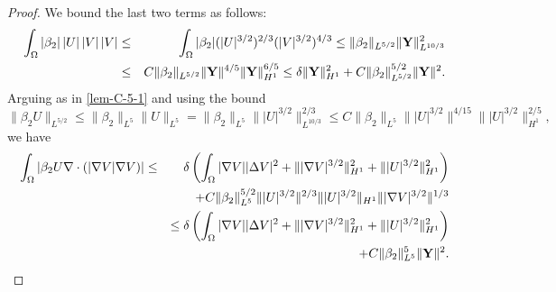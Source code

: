 \documentclass[11pt,reqno]{amsart}%
\numberwithin{equation}{section}
\begin{document}
{\begin{proof}
We bound the last two terms as follows:
 \begin{eqnarray}
\int_\Omega|\beta_2|\, |U|\,|V|\,|V|
&\le&\int_\Omega |\beta_2| (|U|^{3/2})^{2/3} (|V| ^{3/2})^{4/3}%
\le  \Vert \beta_2 \Vert_{L^{5/2}} \|{\bf Y}\|_{L^{10/3}}^2
\nonumber\\
&\le& C \Vert \beta_2 \Vert_{L^{5/2}} \|{\bf Y}\|^{4/5}  \|{\bf Y}\|_{H^1}^{6/5}
\le  \delta  \|{\bf Y}\|_{H^1}^{2} + C \Vert \beta_2 \Vert_{L^{5/2}}^{5/2} \|{\bf Y}\|^{2}.
\label{corol-A-8}
\end{eqnarray}
Arguing as in \eqref{lem-C-5-1} and using the bound
$$\|\beta_2U\|_{L^{5/2}}
\le \|\beta_2\|_{L^{5}} \| U\|_{L^5}
= \|\beta_2\|_{L^{5}} \| |U|^{3/2} \|_{L^{10/3}}^{2/3}
\le C \|\beta_2\|_{L^{5}} \| |U|^{3/2} \|^{4/15}  \| |U|^{3/2} \|_{H^1}^{2/5},
$$
  we have 
\begin{eqnarray}
\int_\Omega| \beta_2U\nabla\cdot(|\nabla V|\nabla V)|
&\le& \delta\left(\int_\Omega |\nabla V||\Delta V|^2+\||\nabla V|^{3/2}\|^2_{H^1}+\||U|^{3/2}\|^2_{H^1}\right) 
\nonumber\\
&&\ \ +C\|\beta_2\|_{L^{5}}^{5/2} \| |U|^{3/2} \|^{2/3}  \| |U|^{3/2} \|_{H^1} \||\nabla V|^{3/2}\|^{1/3}  
\nonumber\\
&&\le \delta\left(\int_\Omega |\nabla V||\Delta V|^2+\||\nabla V|^{3/2}\|^2_{H^1}+\||U|^{3/2}\|^2_{H^1}\right)\nonumber\\ 
&&\ \ +C\|\beta_2\|_{L^{5}}^{5} \|{\bf Y} \|^{2}. 
\label{corol-A-9}
\end{eqnarray}


\end{proof}}
\end{document}
